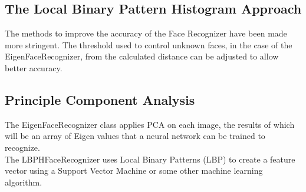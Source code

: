 %
%

\subsection{The Local Binary Pattern Histogram Approach}
The methods to improve the accuracy of the Face Recognizer have been made more stringent. The threshold used to control unknown faces, in the case of the EigenFaceRecognizer, from the calculated distance can be adjusted to allow better accuracy. \\

\subsection{Principle Component Analysis}

The EigenFaceRecognizer class applies PCA on each image, the results of which will be an array of Eigen values that a neural network can be trained to recognize. \\
The LBPHFaceRecognizer uses Local Binary Patterns (LBP) to create a feature vector using a Support Vector Machine or some other machine learning algorithm. \\

